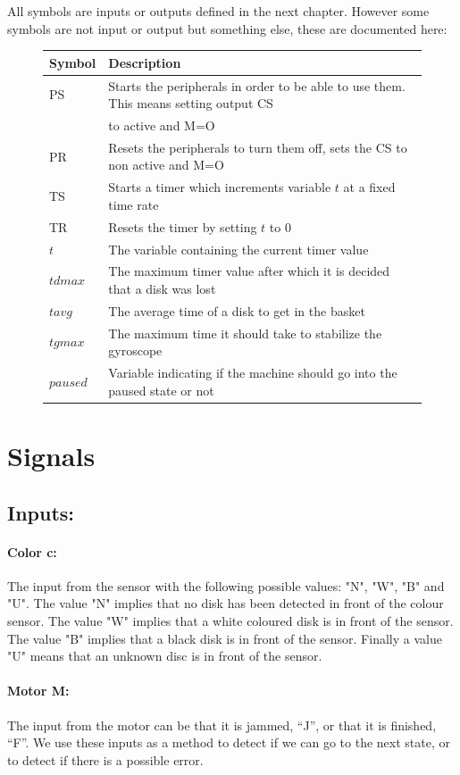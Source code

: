 \documentclass[a4paper,oneside,11pt]{article}
\begin{document}
All symbols are inputs or outputs defined in the next chapter. However some symbols are not input or output but something else, these are documented here:

\begin{figure}[H]
\begin{tabular}{|l|l|}
\hline
\textbf{Symbol} & \textbf{Description} \\
\hline
PS & Starts the peripherals in order to be able to use them. This means setting output CS \\
 &  to active and M=O \\
PR & Resets the peripherals to turn them off, sets the CS to non active and M=O \\
TS & Starts a timer which increments variable $t$ at a fixed time rate \\
TR & Resets the timer by setting $t$ to 0\\
$t$ & The variable containing the current timer value \\
$tdmax$ & The maximum timer value after which it is decided that a disk was lost \\
$tavg$ & The average time of a disk to get in the basket \\
$tgmax$ & The maximum time it should take to stabilize the gyroscope \\
$paused$ & Variable indicating if the machine should go into the paused state or not \\
\hline
\end{tabular}
\end{figure}

\section{Signals}
\subsection{Inputs:}
\paragraph{Color c:} The input from the sensor with the following possible values: "N", "W", "B" and "U". The value "N" implies that no disk has been detected in front of the colour sensor. The value "W" implies that a white coloured disk is in front of the sensor. The value "B" implies that a black disk is in front of the sensor. Finally a value "U" means that an unknown disc is in front of the sensor.
\paragraph{Motor M:} The input from the motor can be that it is jammed, “J”, or that it is finished, “F”. We use these inputs as a method to detect if we can go to the next state, or to detect if there is a possible error.
\end{document}
